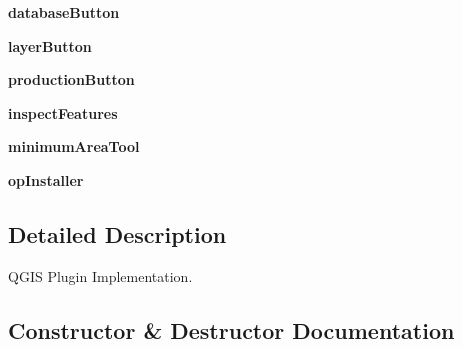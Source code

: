 \begin{DoxyCompactItemize}
\item 
\mbox{\label{class_dsg_tools_1_1dsg__tools_1_1_dsg_tools_ad206806ed41fc884c334a8c4484a7427}} 
{\bfseries database\+Button}
\item 
\mbox{\label{class_dsg_tools_1_1dsg__tools_1_1_dsg_tools_a07865e85c2882f90bf294128259dd400}} 
{\bfseries layer\+Button}
\item 
\mbox{\label{class_dsg_tools_1_1dsg__tools_1_1_dsg_tools_a39a28fa5c7c660b00c704ab3f010df58}} 
{\bfseries production\+Button}
\item 
\mbox{\label{class_dsg_tools_1_1dsg__tools_1_1_dsg_tools_aea3c0b3ae58c1977d99eb2fce9d33fff}} 
{\bfseries inspect\+Features}
\item 
\mbox{\label{class_dsg_tools_1_1dsg__tools_1_1_dsg_tools_a737dd83f8ab735ad890aaba670d7a09a}} 
{\bfseries minimum\+Area\+Tool}
\item 
\mbox{\label{class_dsg_tools_1_1dsg__tools_1_1_dsg_tools_ae970f7455dd8842e1d797f2ef2e9b519}} 
{\bfseries op\+Installer}
\end{DoxyCompactItemize}


\subsection{Detailed Description}
\begin{DoxyVerb}QGIS Plugin Implementation.\end{DoxyVerb}
 

\subsection{Constructor \& Destructor Documentation}
\mbox{\label{class_dsg_tools_1_1dsg__tools_1_1_dsg_tools_af233064bb2aff6407b3824c4be61ef37}} 
